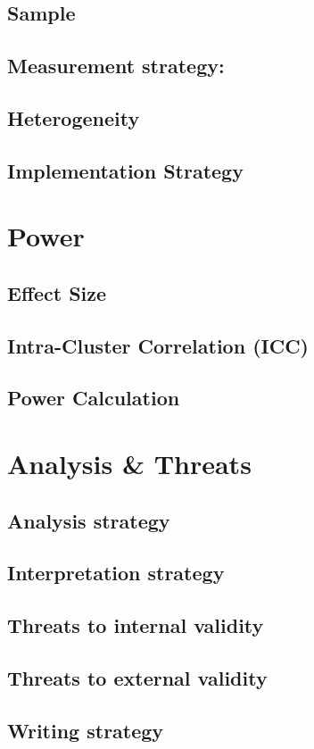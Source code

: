 \documentclass{report}\usepackage[]{graphicx}\usepackage[]{color}
\begin{document}
\subsection*{Sample}
\subsection*{Measurement strategy:}
\subsection*{Heterogeneity}
\subsection*{Implementation Strategy}

\section{Power}


\subsection*{Effect Size}
\subsection*{Intra-Cluster Correlation (ICC)}
\subsection*{Power Calculation}

\section{Analysis \& Threats}

\subsection*{Analysis strategy}
\subsection*{Interpretation strategy}
\subsection*{Threats to internal validity}
\subsection*{Threats to external validity}
\subsection*{Writing strategy}
\end{document}
